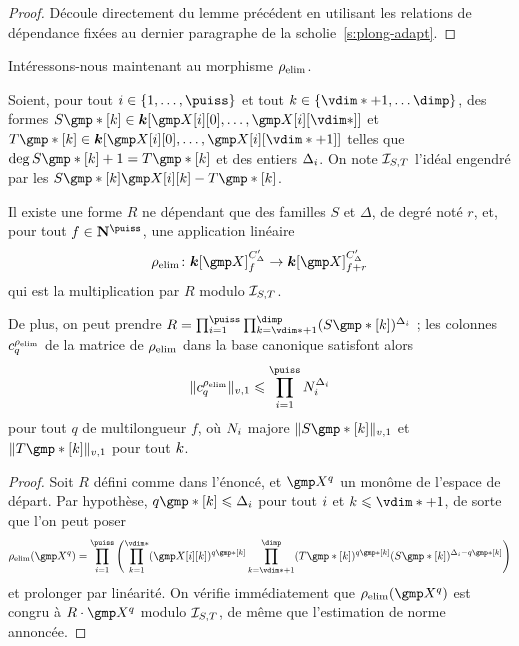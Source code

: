 \begin{proof}
  Découle directement du lemme précédent en utilisant les relations de
  dépendance fixées au dernier paragraphe de la scholie~\ref{s:plong-adapt}.
\end{proof}

Intéressons-nous maintenant au morphisme \( \rho\sb{\mathrm{elim}} \).

\begin{lem}
  Soient, pour tout \( \fct \in \{ 1, \dots, \puiss \} \) et tout \( \ind \in
  \{ \vdim* + 1, \dots \dimp \} \), des formes
  \( S\mexp*[\ind] \in \cdn [ \cmh\fct[0], \dots, \cmh\fct[\vdim*] ] \) et
  \( T\mexp*[\ind] \in \cdn [ \cmh\fct[0], \dots, \cmh\fct[\vdim*+1] ] \)
  telles que \( \deg S\mexp*[\ind] + 1 = T\mexp*[\ind] \) et des entiers
  \( \Delta_i \). On note \( \mathcal I_{S, T} \) l'idéal engendré par les
  \( S\mexp*[\ind] \cmh\fct[\ind] - T\mexp*[\ind] \).

  Il existe une forme \( R \) ne dépendant que des familles \( S \) et \(
  \Delta \), de degré noté \( r \), et, pour tout \( f \in \N^\puiss \), une
  application linéaire
  \begin{equation}
    \relim \colon
    \cdn [\cmmh]_ {f}^{C'_\Delta}
    \to
    \cdn [\cmmh]_ {f+r}^{C'_\Delta}
  \end{equation}
  qui est la multiplication par \( R \) modulo \( \mathcal I_{S, T} \).

  De plus, on peut prendre
  \( R = \prod\fctrange \prod_{\ind = \vdim*+1}^{\dimp}
    ( S\mexp*[\ind] )^{\Delta_\fct} \) ; les colonnes \( c_q^{\rho\sb{\mathrm{elim}}} \) de la
  matrice de \( \rho\sb{\mathrm{elim}} \) dans la base canonique satisfont alors
  \begin{equation}
    \nv1{ c_q^{\relim} }
    \le
    \prod\fctrange N_\fct^{\Delta_\fct}
  \end{equation}
  pour tout \( q \) de multilongueur \( f \), où \( N_i \) majore
  \( \nv1{ S\mexp*[\ind] } \) et \( \nv1{ T\mexp*[\ind] } \) pour tout
  \( k \).
\end{lem}

\begin{proof}
  Soit \( R \) défini comme dans l'énoncé, et \( \cmmh^q \) un monôme de
  l'espace de départ. Par hypothèse, \( q\mexp*[\ind] \le \Delta_\fct \) pour
  tout \( i \) et \( \ind \le \vdim* + 1 \), de sorte que l'on peut poser
  \begin{equation}
    \relim( \cmmh^q )
    =
    \prod\fctrange \left(
    \prod_{\ind=1}^{\vdim*}
    (\cmh\fct[\ind])^{q\mexp*[\ind]}
    \prod_{\ind=\vdim*+1}^\dimp
    (T\mexp*[\ind])^{q\mexp*[\ind]}
    (S\mexp*[\ind])^{\Delta_\fct - q\mexp*[\ind]}
    \right)
  \end{equation}
  et prolonger par linéarité. On vérifie immédiatement que \( \relim(\cmmh^q)
  \) est congru à \( R \cdot \cmmh^q \) modulo \( \mathcal I_{S, T} \), de même
  que l'estimation de norme annoncée.
\end{proof}

